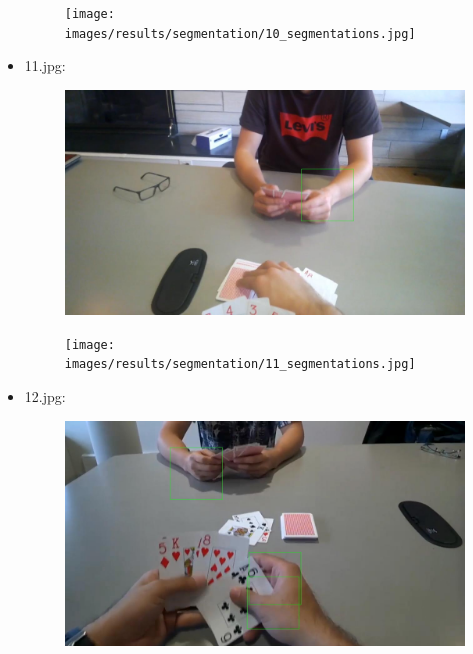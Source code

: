 \begin{itemize}
\begin{figure}[!htb]
\begin{minipage}{0.5\textwidth}
            \end{minipage}\hfill
            \begin{minipage}{0.5\textwidth}
                \centering
                \texttt{[image: images/results/segmentation/10\_segmentations.jpg]}
            \end{minipage}
        \end{figure}
    \item 11.jpg:
        \begin{figure}[!htb]
            \begin{minipage}{0.5\textwidth}
                \centering
                \includegraphics[scale = 0.205]{images/results/detection/11_detections.jpg}
            \end{minipage}\hfill
            \begin{minipage}{0.5\textwidth}
                \centering
                \texttt{[image: images/results/segmentation/11\_segmentations.jpg]}
            \end{minipage}
        \end{figure}
    \newpage
    \item 12.jpg:
        \begin{figure}[!htb]
            \begin{minipage}{0.5\textwidth}
                \centering
                \includegraphics[scale = 0.205]{images/results/detection/12_detections.jpg}

\end{minipage}
\end{figure}
\end{itemize}
